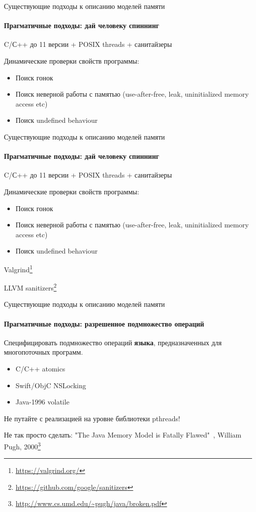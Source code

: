 \begin{frame}[t]{Существующие подходы к описанию моделей памяти}
\framesubtitle{Прагматичные подходы: дай человеку спиннинг}

C/С++ до 11 версии + POSIX threads + санитайзеры

\pause

Динамические проверки свойств программы:
\begin{itemize}
	\item Поиск гонок
	\item Поиск неверной работы с памятью (use-after-free, leak, uninitialized memory access etc)
	\item Поиск undefined behaviour
\end{itemize}

\end{frame}

\begin{frame}[t, noframenumbering]{Существующие подходы к описанию моделей памяти}
\framesubtitle{Прагматичные подходы: дай человеку спиннинг}

C/С++ до 11 версии + POSIX threads + санитайзеры

Динамические проверки свойств программы:
\begin{itemize}
	\item Поиск гонок
	\item Поиск неверной работы с памятью (use-after-free, leak, uninitialized memory access etc)
	\item Поиск undefined behaviour
\end{itemize}

Valgrind\footnote{\tiny\url{https://valgrind.org/}}

LLVM sanitizers\footnote{\tiny\url{https://github.com/google/sanitizers}}

\end{frame}


\begin{frame}{Существующие подходы к описанию моделей памяти}
\framesubtitle{Прагматичные подходы: разрешенное подмножество операций}

Специфицировать подмножество операций \textbf{языка}, предназначенных для многопоточных программ.

\begin{itemize}
\pause
\item C/C++ atomics

\pause
\item Swift/ObjC NSLocking

\pause
\item Java-1996 volatile
\end{itemize}

\pause
Не путайте с реализацией на уровне библиотеки pthreads!

\pause
Не так просто сделать: "The Java Memory Model is Fatally Flawed"\ , William Pugh, 2000\footnote<6->{\tiny\url{http://www.cs.umd.edu/~pugh/java/broken.pdf}}

\end{frame}


